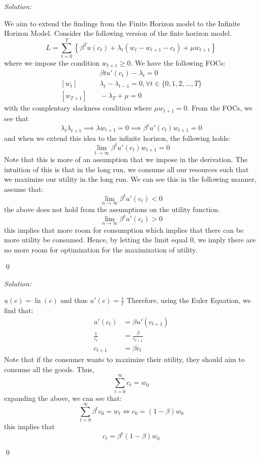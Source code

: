 \documentclass[12pt]{article}
\newcounter{subproblem}
\renewcommand{\thesubproblem}{\arabic{subproblem}} %
\newenvironment{subprob}[1][]{
  \refstepcounter{subproblem}
  \begin{trivlist}
  \item[\hskip \labelsep {\bfseries (\thesubproblem)}]
}{
  \end{trivlist}
}
\newenvironment{subsol}
    {\emph{Solution:}
    }
    {
    \qed
    }
\begin{document}
\begin{subsol}
    We aim to extend the findings from the Finite Horizon model to the Infinite Horizon Model. Consider the following version of the finte horizon model. 
    \[
    L = \sum_{t = 0}^{T} \left \{ \beta^T u(c_t) + \lambda_t (w_t - w_{t+1} - c_t) + \mu w_{t+1}\right\}
    \]
    where we impose the condition $w_{t+1} \geq 0$. We have the following FOCs:
    \begin{align*}
        [c_t] & \quad \beta t u'(c_t) - \lambda_t = 0\\
        [w_t] & \quad \lambda_t - \lambda_{t-1} = 0, \forall t \in \{0,1,2, \dots, T\}\\
        [w_{T+1}] & \quad -\lambda_T + \mu = 0
    \end{align*}
    with the complentary slackness condition where $\mu w_{t+1} = 0$. From the FOCs, we see that 
    \[
    \lambda_t \lambda_{t+1} \implies \lambda w_{t+1} = 0 \implies \beta^t u'(c_t) w_{t+1} = 0 
    \]
    and when we extend this idea to the infinite horizon, the following holds:
    \[
    \lim_{t \to \infty} \beta^t u'(c_t) w_{t+1} = 0
    \]
    Note that this is more of an assumption that we impose in the derivation. The intuition of this is that in the long run, we consume all our resources such that we maximize our utility in the long run.  We can see this in the following manner, assume that:
    \[
    \lim_{n \to \infty} \beta^t u'(c_t) < 0
    \]
    the above does not hold from the assumptions on the utility function. 
    \[
        \lim_{n \to \infty} \beta^t u'(c_t) > 0
    \]
    this implies that more room for consumption which implies that there can be more utility be consumed. Hence, by letting the limit equal 0, we imply there are no more room for optimization for the maximization of utility. 
\end{subsol}
\begin{subprob}
\end{subprob}
\begin{subsol}
    $u(c) = \ln (c)$ and thus $u'(c) = \frac{1}{c}$ Therefore, using the Euler Equation, we find that:
    \begin{align*}
        u'(c_t) &= \beta u'(c_{t+1})\\
        \frac{1}{c_t} &= \frac{\beta}{c_{t+1}}\\
        c_{t+1} &= \beta c_t
    \end{align*}
    Note that if the consumer wants to maximize their utility, they should aim to consume all the goods. Thus, 
    \[
    \sum_{t = 0}^{\infty} c_t = w_0
    \]
    expanding the above, we can see that: 
    \[
    \sum_{t = 0 }^{\infty} \beta^t c_0 = w_t \iff c_0 = (1-\beta)w_0 
    \] 
    this implies that 
    \[
    c_t = \beta^t (1-\beta)w_0
    \]
\end{subsol}
\end{document}
